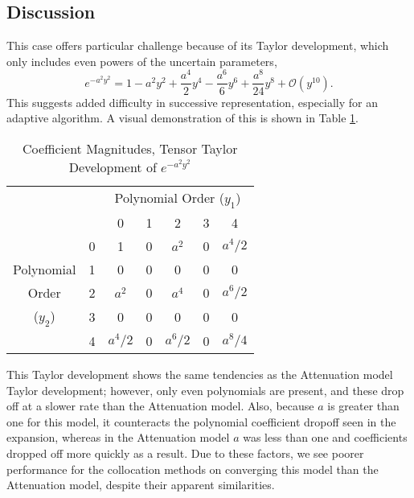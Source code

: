\subsection{Discussion}
This case offers particular challenge because of its Taylor development, which only includes even powers of
the uncertain parameters,
\begin{equation}\label{eq: taylor peak}
  e^{-a^2y^2} = 1 - a^2y^2 + \frac{a^4}{2}y^4 - \frac{a^6}{6}y^6 + \frac{a^8}{24}y^8 + \mathcal{O}(y^{10}).
\end{equation}
This suggests added difficulty in successive representation, especially for an
adaptive algorithm.  A visual demonstration of this is shown in Table
\ref{tab: gauss coeffs}.
\begin{table}
  \centering
  \begin{tabular}{|c c|c c c c c|}
    \cline{3-7}\multicolumn{2}{c|}{ } & \multicolumn{5}{c|}{Polynomial Order ($y_1$)} \\
\multicolumn{2}{c|}{ } & 0       & 1 & 2       & 3 & 4       \\
    \hline         & 0 & 1       & 0 & $a^2$   & 0 & $a^4/2$ \\ 
Polynomial         & 1 & 0       & 0 & 0       & 0 & 0       \\
Order              & 2 & $a^2$   & 0 & $a^4$   & 0 & $a^6/2$ \\
($y_2$)            & 3 & 0       & 0 & 0       & 0 & 0       \\
                   & 4 & $a^4/2$ & 0 & $a^6/2$ & 0 & $a^8/4$ \\
    \hline
  \end{tabular}
  \caption{Coefficient Magnitudes, Tensor Taylor Development of $e^{-a^2y^2}$}
  \label{tab: gauss coeffs}
\end{table}
This Taylor development shows the same tendencies as the Attenuation model Taylor development; however, only
even polynomials are present, and these drop off at a slower rate than the Attenuation model.  Also, because
$a$ is greater than one for this model, it counteracts the polynomial coefficient dropoff seen in the
expansion, whereas in the Attenuation model $a$ was less than one and coefficients dropped off more quickly as
a result.  Due to these factors, we see poorer performance for the collocation methods on converging this
model than the Attenuation model, despite their apparent similarities.

